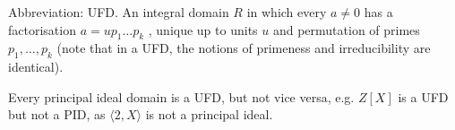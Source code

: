 Abbreviation: UFD. An integral domain  $ R $  in
which every  $ a \neq 0 $  has a factorisation  $ a=up_1 \ldots p_k $ , unique up
to units  $ u $  and permutation of primes
 $ p_1, \ldots , p_k $  (note that in a UFD, the notions of primeness and
irreducibility are identical).
 \par
Every principal ideal domain is a UFD, but not
vice versa, e.g.   $  {Z}[X] $  is a UFD but not a PID, as  $  \langle 2,X \rangle $ 
is not a principal ideal.